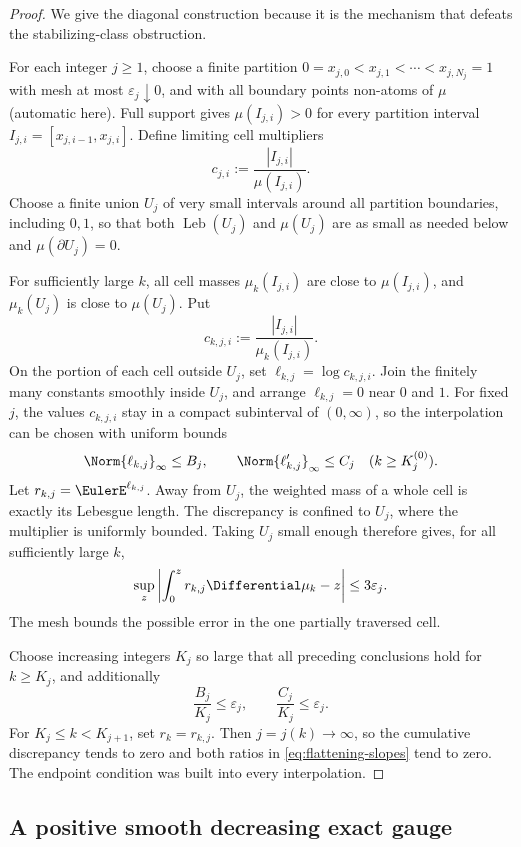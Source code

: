 \documentclass[11pt]{article}
\theoremstyle{definition}
\theoremstyle{remark}
\newcommand{\Leb}{\operatorname{Leb}}
\begin{document}
\begin{proof}
We give the diagonal construction because it is the mechanism that defeats the
stabilizing-class obstruction.

For each integer \(j\ge1\), choose a finite partition
\(0=x_{j,0}<x_{j,1}<\cdots<x_{j,N_j}=1\) with mesh at most
\(\varepsilon_j\downarrow0\), and with all boundary points non-atoms of
\(\mu\) (automatic here).  Full support gives
\(\mu(I_{j,i})>0\) for every partition interval
\(I_{j,i}=[x_{j,i-1},x_{j,i}]\).  Define limiting cell multipliers
\[
 c_{j,i}:=\frac{|I_{j,i}|}{\mu(I_{j,i})}.
\]
Choose a finite union \(U_j\) of very small intervals around all partition
boundaries, including \(0,1\), so that both \(\Leb(U_j)\) and \(\mu(U_j)\)
are as small as needed below and \(\mu(\partial U_j)=0\).

For sufficiently large \(k\), all cell masses \(\mu_k(I_{j,i})\) are close
to \(\mu(I_{j,i})\), and \(\mu_k(U_j)\) is close to \(\mu(U_j)\).  Put
\[
 c_{k,j,i}:=\frac{|I_{j,i}|}{\mu_k(I_{j,i})}.
\]
On the portion of each cell outside \(U_j\), set
\(\ell_{k,j}=\log c_{k,j,i}\).  Join the finitely many constants smoothly
inside \(U_j\), and arrange \(\ell_{k,j}=0\) near \(0\) and \(1\).
For fixed \(j\), the values \(c_{k,j,i}\) stay in a compact subinterval of
\((0,\infty)\), so the interpolation can be chosen with uniform bounds
\[
 \Norm{\ell_{k,j}}_\infty\le B_j,
 \qquad
 \Norm{\ell_{k,j}'}_\infty\le C_j
 \quad(k\ge K_j^{(0)}).
\]
Let \(r_{k,j}=\EulerE^{\ell_{k,j}}\).  Away from \(U_j\), the weighted mass of a
whole cell is exactly its Lebesgue length.  The discrepancy is confined to
\(U_j\), where the multiplier is uniformly bounded.  Taking \(U_j\) small
enough therefore gives, for all sufficiently large \(k\),
\[
 \sup_z\left|\int_0^zr_{k,j}\Differential\mu_k-z\right|
 \le 3\varepsilon_j.
\]
The mesh bounds the possible error in the one partially traversed cell.

Choose increasing integers \(K_j\) so large that all preceding conclusions
hold for \(k\ge K_j\), and additionally
\[
 \frac{B_j}{K_j}\le\varepsilon_j,
 \qquad
 \frac{C_j}{K_j}\le\varepsilon_j.
\]
For \(K_j\le k<K_{j+1}\), set \(r_k=r_{k,j}\).  Then
\(j=j(k)\to\infty\), so the cumulative discrepancy tends to zero and both
ratios in \eqref{eq:flattening-slopes} tend to zero.  The endpoint condition
was built into every interpolation.
\end{proof}

\subsection{A positive smooth decreasing exact gauge}
\end{document}
